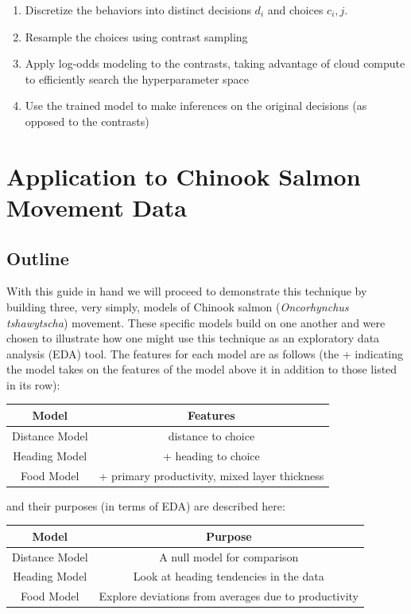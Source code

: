 \documentclass[11pt]{article}
\begin{document}
\begin{enumerate}
\item Discretize the behaviors into distinct decisions $d_i$ and choices $c_i,j$. 
\item Resample the choices using contrast sampling
\item Apply log-odds modeling to the contrasts, taking advantage of cloud compute to efficiently search the hyperparameter space
\item Use the trained model to make inferences on the original decisions (as opposed to the contrasts)
\end{enumerate}

\section*{Application to Chinook Salmon Movement Data}

\subsection*{Outline}

With this guide in hand we will proceed to demonstrate this technique by building three, very simply, models of Chinook salmon (\textit{Oncorhynchus tshawytscha}) movement. These specific models build on one another and were chosen to illustrate how one might use this technique as an exploratory data analysis (EDA) tool. The features for each model are as follows (the + indicating the model takes on the features of the model above it in addition to those listed in its row): 

\begin{center}
\begin{tabular}{| c | c  | } 
\hline 
Model & Features \\
\hline
Distance Model & distance to choice \\
Heading Model & + heading to choice \\
Food Model & + primary productivity, mixed layer thickness \\
\hline
\end{tabular}
\end{center}

and their purposes (in terms of EDA) are described here:

\begin{center}
\begin{tabular}{| c | c  | } 
\hline 
Model & Purpose \\
\hline
Distance Model & A null model for comparison \\
Heading Model & Look at heading tendencies in the data \\
Food Model & Explore deviations from averages due to productivity \\
\hline
\end{tabular}
\end{center} 
\end{document}
